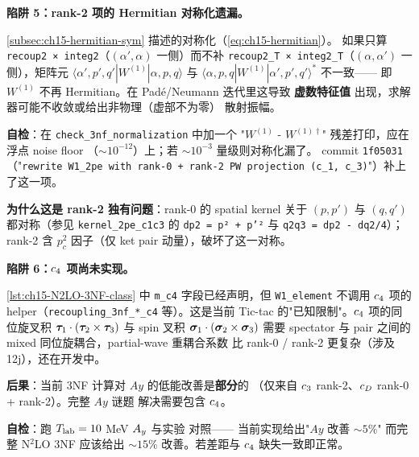 \begin{pitfallbox}[label={pit:ch15-rank2-sym}]
\textbf{陷阱 5：rank-2 项的 Hermitian 对称化遗漏。}

\cref{subsec:ch15-hermitian-sym} 描述的对称化（\cref{eq:ch15-hermitian}）。
如果只算 \texttt{recoup2 × integ2}（\((\alpha', \alpha)\) 一侧）而不补
\texttt{recoup2\_T × integ2\_T}（\((\alpha, \alpha')\) 一侧），矩阵元
\(\langle \alpha', p', q' | W^{(1)} | \alpha, p, q \rangle\)
与 \(\langle \alpha, p, q | W^{(1)} | \alpha', p', q' \rangle^*\) 不一致——
即 \(W^{(1)}\) 不再 Hermitian。在 Padé/Neumann 迭代里这导致
\textbf{虚数特征值} 出现，求解器可能不收敛或给出非物理（虚部不为零）
散射振幅。

\textbf{自检}：在 \texttt{check\_3nf\_normalization} 中加一个
"\(W^{(1)}\) - \(W^{(1)\dagger}\)" 残差打印，应在浮点 noise floor
（\(\sim 10^{-12}\)）上；若 \(\sim 10^{-3}\) 量级则对称化漏了。
commit \texttt{1f05031}（"\texttt{rewrite W1\_2pe with rank-0 + rank-2 PW
projection (c\_1, c\_3)}"）补上了这一项。

\textbf{为什么这是 rank-2 独有问题}：rank-0 的 spatial kernel 关于
\((p, p')\) 与 \((q, q')\) 都对称（参见 \texttt{kernel\_2pe\_c1c3} 的
\texttt{dp2 = p² + p'²} 与 \texttt{q2q3 = dp2 - dq2/4}）；rank-2 含
\(p_c^2\) 因子（仅 ket pair 动量），破坏了这一对称。
\end{pitfallbox}

\begin{pitfallbox}[label={pit:ch15-c4-not-implemented}]
\textbf{陷阱 6：\(c_4\) 项尚未实现。}

\cref{lst:ch15-N2LO-3NF-class} 中 \texttt{m\_c4} 字段已经声明，但
\texttt{W1\_element} 不调用 \(c_4\) 项的 helper（\texttt{recoupling\_3nf\_*\_c4}
等）。这是当前 Tic-tac 的"已知限制"。\(c_4\) 项的同位旋叉积
\(\bm{\tau}_1 \cdot (\bm{\tau}_2 \times \bm{\tau}_3)\) 与 spin
叉积 \(\bm{\sigma}_1 \cdot (\bm{\sigma}_2 \times \bm{\sigma}_3)\)
需要 spectator 与 pair 之间的 mixed 同位旋耦合，partial-wave 重耦合系数
比 rank-0 / rank-2 更复杂（涉及 12j），还在开发中。

\textbf{后果}：当前 3NF 计算对 \(Ay\) 的低能改善是\textbf{部分}的
（仅来自 \(c_3\) rank-2、\(c_D\) rank-0 + rank-2）。完整 \(Ay\) 谜题
解决需要包含 \(c_4\)。

\textbf{自检}：跑 \({T_{\text{lab}}} = 10\) MeV \(A_y\) 与实验 \cite{Witala1988} 对照——
当前实现给出"\(Ay\) 改善 \(\sim 5\%\)" 而完整 N\(^2\)LO 3NF 应该给出
\(\sim 15\%\) 改善。若差距与 \(c_4\) 缺失一致即正常。
\end{pitfallbox}

